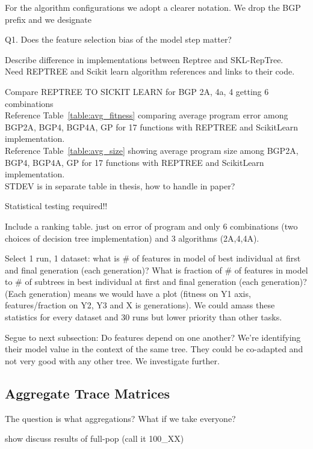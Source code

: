 For the algorithm configurations we adopt a clearer notation. We drop the BGP prefix and we designate 

Q1. Does the feature selection bias of the model step matter? 

Describe difference in implementations between Reptree and SKL-RepTree.\\
Need REPTREE and Scikit learn algorithm references and links to their code.

Compare REPTREE TO SICKIT LEARN for BGP 2A, 4a, 4 getting 6 combinations\\
Reference Table~\ref{table:avg_fitness} comparing average program error among BGP2A, BGP4, BGP4A, GP for 17 functions with REPTREE and ScikitLearn implementation.\\
Reference Table~\ref{table:avg_size} showing average program size among BGP2A, BGP4, BGP4A, GP for 17 functions with REPTREE and ScikitLearn implementation.\\
STDEV is in separate table in thesis, how to handle in paper?

Statistical testing required!!

Include a ranking table.  just on error of program and only 6 combinations (two choices of decision tree implementation) and 3 algorithms (2A,4,4A). 

Select 1 run, 1 dataset: what is \# of features in model of best individual at first and final generation (each generation)? What is fraction of \# of features in model to \# of subtrees in best individual at first and final generation (each generation)?  (Each generation) means we would have a plot (fitness on Y1 axis, features/fraction on Y2, Y3 and X is generations). We could amass these statistics for every dataset and 30 runs but lower priority than other tasks.

Segue to next subsection: Do features depend on one another? We're identifying their model value in the context of the same tree. They could be co-adapted and not very good with any other tree. We investigate further.

\subsection{Aggregate Trace Matrices}\label{sect:agg-features}

The question is what aggregations? What if we take everyone?

show discuss results of full-pop (call it 100\_XX)\\

